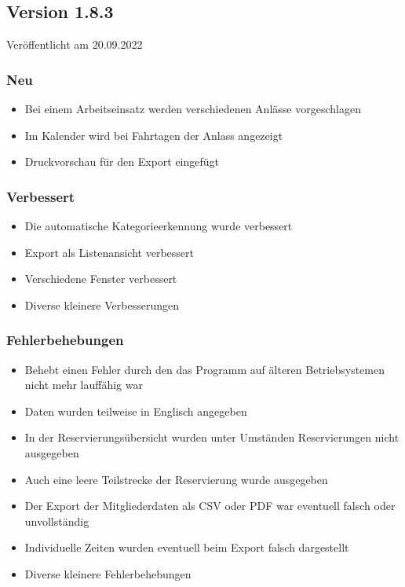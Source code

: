 \begin{neu}
\subsection{Version 1.8.3}
\label{version:1:8:3}
Veröffentlicht am 20.09.2022
\subsubsection{Neu}
\begin{itemize}
  \item
  Bei einem Arbeitseinsatz werden verschiedenen Anlässe vorgeschlagen
  \item
  Im Kalender wird bei Fahrtagen der Anlass angezeigt
  \item
  Druckvorschau für den Export eingefügt
\end{itemize}
\subsubsection{Verbessert}
\begin{itemize}
  \item
  Die automatische Kategorieerkennung wurde verbessert
  \item
  Export als Listenansicht verbessert
  \item
  Verschiedene Fenster verbessert
  \item
  Diverse kleinere Verbesserungen
\end{itemize}

\subsubsection{Fehlerbehebungen}
\begin{itemize}
  \item
  Behebt einen Fehler durch den das Programm auf älteren Betriebsystemen nicht mehr lauffähig war
  \item
  Daten wurden teilweise in Englisch angegeben
  \item
  In der Reservierungsübersicht wurden unter Umständen Reservierungen nicht ausgegeben
  \item
  Auch eine leere Teilstrecke der Reservierung wurde ausgegeben
  \item
  Der Export der Mitgliederdaten als CSV oder PDF war eventuell falsch oder unvollständig
  \item
  Individuelle Zeiten wurden eventuell beim Export falsch dargestellt
  \item
  Diverse kleinere Fehlerbehebungen
\end{itemize}
\end{neu}
